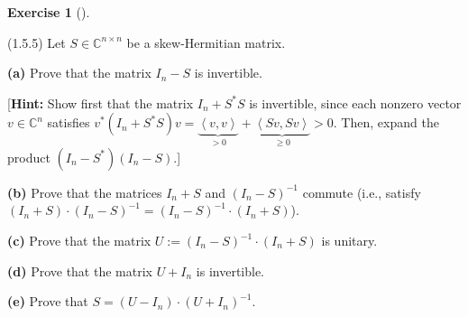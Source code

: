 \documentclass[numbers=enddot,12pt,final,onecolumn,notitlepage]{scrartcl}
\newcounter{exer}
\theoremstyle{definition}
\newtheorem{exmp}[exer]{Exercise}
\newenvironment{exercise}[1][]
{\begin{exmp}[#1]\begin{leftbar}}
        {\end{leftbar}\end{exmp}}
\begin{document}
\begin{exercise}
	 (1.5.5) \label{exe.unitary.skew-herm.1}Let $S\in\mathbb{C}^{n\times n}$ be a
	skew-Hermitian matrix.

	\textbf{(a)} Prove that the matrix $I_{n}-S$ is invertible.

	[\textbf{Hint:} Show first that the matrix $I_{n}+S^{\ast}S$ is invertible,
	since each nonzero vector $v\in\mathbb{C}^{n}$ satisfies $v^{\ast}\left(
		I_{n}+S^{\ast}S\right)  v=\underbrace{\left\langle v,v\right\rangle }%
		_{>0}+\underbrace{\left\langle Sv,Sv\right\rangle }_{\geq0}>0$. Then, expand
	the product $\left(  I_{n}-S^{\ast}\right)  \left(  I_{n}-S\right)  $.]

	\textbf{(b)} Prove that the matrices $I_{n}+S$ and $\left(  I_{n}-S\right)
		^{-1}$ commute (i.e., satisfy $\left(  I_{n}+S\right)  \cdot\left(
		I_{n}-S\right)  ^{-1}=\left(  I_{n}-S\right)  ^{-1}\cdot\left(  I_{n}%
		+S\right)  $).

	\textbf{(c)} Prove that the matrix $U:=\left(  I_{n}-S\right)  ^{-1}%
		\cdot\left(  I_{n}+S\right)  $ is unitary.

	\textbf{(d)} Prove that the matrix $U+I_{n}$ is invertible.

	\textbf{(e)} Prove that $S=\left(  U-I_{n}\right)  \cdot\left(  U+I_{n}%
		\right)  ^{-1}$.
\end{exercise}
\end{document}
